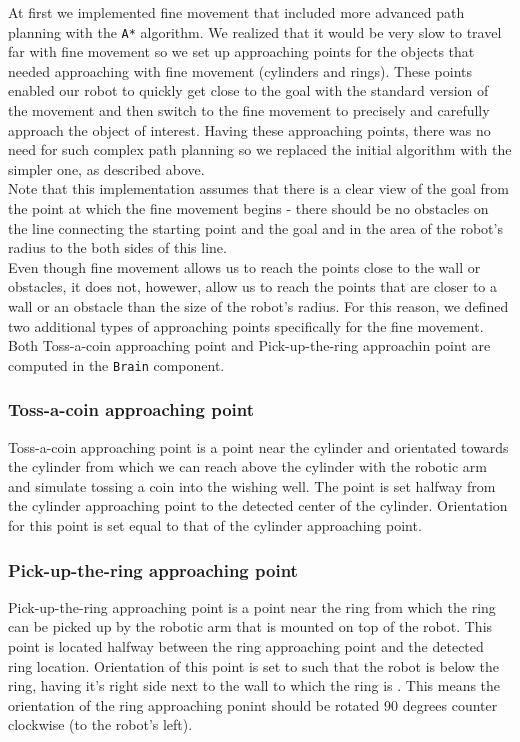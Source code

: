 \documentclass[12pt,a4paper]{article}
\begin{document}
	At first we implemented fine movement that included more advanced path planning with the \texttt{A*} algorithm. We realized that it would be very slow to travel far with fine movement so we set up approaching points for the objects that needed approaching with fine movement (cylinders and rings). These points enabled our robot to quickly get close to the goal with the standard version of the movement and then switch to the fine movement to precisely and carefully approach the object of interest. Having these approaching points, there was no need for such complex path planning so we replaced the initial algorithm with the simpler one, as described above. \\
	
	Note that this implementation assumes that there is a clear view of the goal from the point at which the fine movement begins - there should be no obstacles on the line connecting the starting point and the goal and in the area of the robot's radius to the both sides of this line. \\

	Even though fine movement allows us to reach the points close to the wall or obstacles, it does not, howewer, allow us to reach the points that are closer to a wall or an obstacle than the size of the robot's radius. For this reason, we defined two additional types of approaching points specifically for the fine movement. Both Toss-a-coin approaching point and Pick-up-the-ring approachin point are computed in the \texttt{Brain} component. \\

	\subsubsection{Toss-a-coin approaching point} \label{toss-a-coin-point}
	Toss-a-coin approaching point is a point near the cylinder and orientated towards the cylinder from which we can reach above the cylinder with the robotic arm and simulate tossing a coin into the wishing well. The point is set halfway from the cylinder approaching point to the detected center of the cylinder. Orientation for this point is set equal to that of the cylinder approaching point. \\

	\subsubsection{Pick-up-the-ring approaching point} \label{pick-up-the-ring-point}
	Pick-up-the-ring approaching point is a point near the ring from which the ring can be picked up by the robotic arm that is mounted on top of the robot. This point is located halfway between the ring approaching point and the detected ring location. Orientation of this point is set to such that the robot is below the ring, having it's right side next to the wall to which the ring is . This means the orientation of the ring approaching ponint should be rotated 90 degrees counter clockwise (to the robot's left). \\
	
\end{document}
